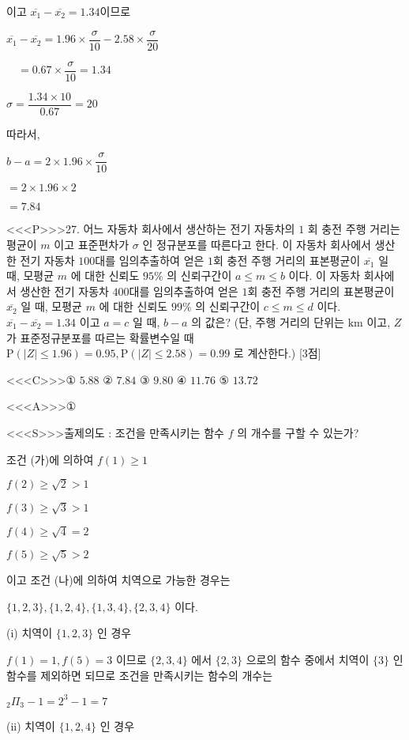\documentclass{oblivoir}
\begin{document}
이고 $\overline{x_{1}}-\overline{x_{2}}=1.34$이므로

$\overline{x_{1}}-\overline{x_{2}}=1.96 \times \dfrac{\sigma}{10}-2.58 \times \dfrac{\sigma}{20}$

$\quad=0.67 \times \dfrac{\sigma}{10}=1.34$

$\sigma=\dfrac{1.34 \times 10}{0.67}=20$

따라서,

$b-a=2 \times 1.96 \times \dfrac{\sigma}{10}$

$=2 \times 1.96 \times 2$

$=7.84$


<<<P>>>27. 어느 자동차 회사에서 생산하는 전기 자동차의 $1$ 회 충전 주행 거리는 평균이 $m$ 이고 표준편차가 $\sigma$ 인 정규분포를 따른다고 한다. 이 자동차 회사에서 생산한 전기 자동차 $100$대를 임의추출하여 얻은 $1$회 충전 주행 거리의 표본평균이 $\overline{x_{1}}$ 일 때, 모평균 $m$ 에 대한 신뢰도 $95 \%$ 의 신뢰구간이 $a \leq m \leq b$ 이다. 이 자동차 회사에서 생산한 전기 자동차 $400$대를 임의추출하여 얻은 $1$회 충전 주행 거리의 표본평균이 $\overline{x_{2}}$ 일 때, 모평균 $m$ 에 대한 신뢰도 $99 \%$ 의 신뢰구간이 $c \leq m \leq d$ 이다. $\overline{x_{1}}-\overline{x_{2}}=1.34$ 이고 $a=c$ 일 때, $b-a$ 의 값은? (단, 주행 거리의 단위는 $\mathrm{km}$ 이고, $Z$ 가 표준정규분포를 따르는 확률변수일 때 $\mathrm{P}(|Z| \leq 1.96)=0.95, \mathrm{P}(|Z| \leq 2.58)=0.99$ 로 계산한다.) [3점]

<<<C>>>① $5.88$
② $7.84$
③ $9.80$
④ $11.76$
⑤ $13.72$


<<<A>>>①

<<<S>>>출제의도 : 조건을 만족시키는 함수 $f$ 의 개수를 구할 수 있는가?

조건 (가)에 의하여
$f(1) \geq 1$

$f(2) \geq \sqrt{2}>1$

$f(3) \geq \sqrt{3}>1$

$f(4) \geq \sqrt{4}=2$

$f(5) \geq \sqrt{5}>2$

이고 조건 (나)에 의하여 치역으로 가능한 경우는

$\{1,2,3\},\{1,2,4\},\{1,3,4\},\{2,3,4\}$
이다.

(i) 치역이 $\{1,2,3\}$ 인 경우

$f(1)=1, f(5)=3$ 이므로 $\{2,3,4\}$ 에서 $\{2,3\}$ 으로의 함수 중에서 치역이 $\{3\}$ 인 함수를 제외하면 되므로 조건을 만족시키는 함수의 개수는

${ }_{2} \Pi_{3}-1=2^{3}-1=7$

(ii) 치역이 $\{1,2,4\}$ 인 경우
\end{document}
